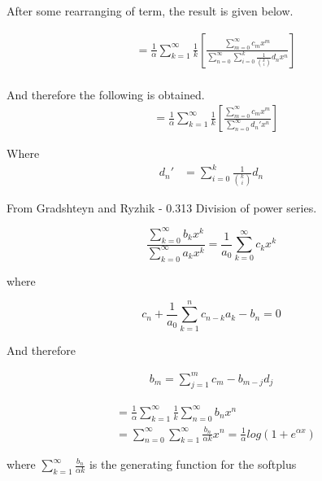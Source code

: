After some rearranging of term, the result is given below.

\begin{align*}
	& = \frac{1}{\alpha}\sum\limits_{k=1}^{\infty}\frac{1}{k}\left[ \frac{\sum\limits_{m=0}^{\infty}c_{m}x^{m}}{\sum\limits_{n=0}^{\infty}\sum\limits_{i=0}^{k}\frac{1}{{k \choose i}}d_{n}x^{n}} \right] \\
\end{align*}

And therefore the following is obtained.
\begin{align*}
	& = \frac{1}{\alpha}\sum\limits_{k=1}^{\infty}\frac{1}{k}\left[ \frac{\sum\limits_{m=0}^{\infty}c_{m}x^{m}}{\sum\limits_{n=0}^{\infty}d_{n}'x^{n}} \right]
\end{align*}

Where
\begin{align*}
 	d_{n}' & = \sum\limits_{i=0}^{k}\frac{1}{{k \choose i}}d_{n}
\end{align*}

From Gradshteyn and Ryzhik - 0.313 Division of power series.

\begin{equation}
	\frac{\sum\limits_{k=0}^{\infty}b_k x^k}{\sum\limits_{k=0}^{\infty}a_k x^k}
	= \frac{1}{a_0}\sum\limits_{k=0}^{\infty}c_kx^k
\end{equation}

where

\begin{equation}
	c_n + \frac{1}{a_0}\sum\limits_{k=1}^n c_{n-k}a_k - b_n = 0
\end{equation}

And therefore

\begin{align*}
	b_{m} = \sum\limits_{j=1}^{m}c_{m}-b_{m-j}d_{j}
\end{align*}

\begin{align*}
	& = \frac{1}{\alpha}\sum\limits_{k=1}^{\infty}\frac{1}{k}\sum\limits_{n=0}^{\infty}b_{n}x^{n} \\
	& = \sum\limits_{n=0}^{\infty}\sum\limits_{k=1}^{\infty}\frac{b_{n}}{\alpha k}x^{n}=\frac{1}{\alpha}log(1+e^{\alpha x})
\end{align*}

where $\sum\limits_{k=1}^{\infty}\frac{b_{n}}{\alpha k}$ is the generating function for the softplus

